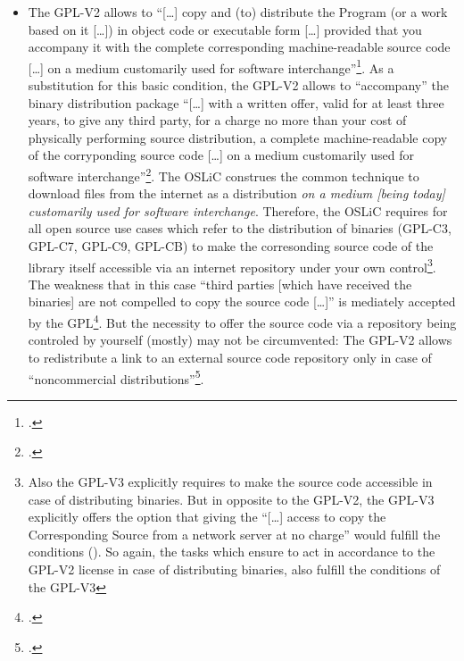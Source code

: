 \begin{itemize}
  \item The GPL-V2 allows to \enquote{[\ldots] copy and (to) distribute the
  Program (or a work based on it [\ldots]) in object code or executable form
  [\ldots] provided that you accompany it with the complete corresponding
  machine-readable source code [\ldots] on a medium customarily used for
  software interchange}\footcite[cf.][\nopage wp.\ §3,
  §3a]{Gpl20OsiLicense1991a}. As a substitution for this basic condition, the
  GPL-V2 allows to \enquote{accompany} the binary distribution package
  \enquote{[\ldots] with a written offer, valid for at least three years, to
  give any third party, for a charge no more than your cost of physically
  performing source distribution, a complete machine-readable copy of the
  corryponding source code [\ldots] on a medium customarily used for software
  interchange}\footcite[cf.][\nopage wp.\ §3b]{Gpl20OsiLicense1991a}. The OSLiC
  construes the common technique to download files from the internet as a
  distribution \emph{on a medium [being today] customarily used for software
  interchange}. Therefore, the OSLiC requires for all open source use cases
  which refer to the distribution of binaries (GPL-C3, GPL-C7, GPL-C9, GPL-CB) to
  make the corresonding source code of the library itself accessible via an
  internet repository under your own control\footnote{\label{Gpl3CondCopyleft}
  Also the GPL-V3 explicitly requires to make the source code accessible in
  case of distributing binaries. But in opposite to the GPL-V2, the GPL-V3
  explicitly offers the option that giving the \enquote{[\ldots] access to copy
  the Corresponding Source from a network server at no charge} would fulfill the
  conditions (\cite[cf.][\nopage wp.\ §6 and §6b]{Gpl30OsiLicense2007a}). So
  again, the tasks which ensure to act in accordance to the GPL-V2 license in
  case of distributing binaries, also fulfill the conditions of the GPL-V3}.
  The weakness that in this case \enquote{third parties [which have received the
  binaries] are not compelled to copy the source code [\ldots]} is mediately
  accepted by the GPL\footcite[cf.][\nopage wp.\ §3, at the
  end]{Gpl20OsiLicense1991a}. But the necessity to offer the source code via a
  repository being controled by yourself (mostly) may not be circumvented: The
  GPL-V2 allows to redistribute a link to an external source code repository
  only in case of \enquote{noncommercial distributions}\footcite[cf.][\nopage
  wp.\ §3c]{Gpl20OsiLicense1991a}.
  

\end{itemize}
